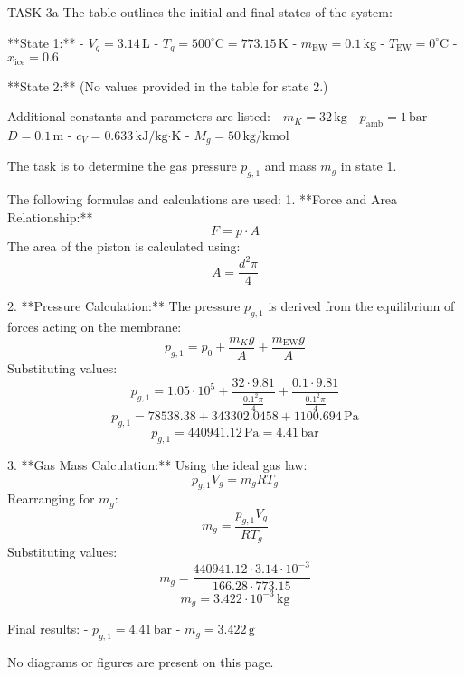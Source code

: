 TASK 3a  
The table outlines the initial and final states of the system:  

**State 1:**  
- \( V_g = 3.14 \, \text{L} \)  
- \( T_g = 500^\circ\text{C} = 773.15 \, \text{K} \)  
- \( m_{\text{EW}} = 0.1 \, \text{kg} \)  
- \( T_{\text{EW}} = 0^\circ\text{C} \)  
- \( x_{\text{ice}} = 0.6 \)  

**State 2:**  
(No values provided in the table for state 2.)  

Additional constants and parameters are listed:  
- \( m_K = 32 \, \text{kg} \)  
- \( p_{\text{amb}} = 1 \, \text{bar} \)  
- \( D = 0.1 \, \text{m} \)  
- \( c_V = 0.633 \, \text{kJ/kg·K} \)  
- \( M_g = 50 \, \text{kg/kmol} \)  

The task is to determine the gas pressure \( p_{g,1} \) and mass \( m_g \) in state 1.  

The following formulas and calculations are used:  
1. **Force and Area Relationship:**  
   \[ F = p \cdot A \]  
   The area of the piston is calculated using:  
   \[ A = \frac{d^2 \pi}{4} \]  

2. **Pressure Calculation:**  
   The pressure \( p_{g,1} \) is derived from the equilibrium of forces acting on the membrane:  
   \[ p_{g,1} = p_0 + \frac{m_K g}{A} + \frac{m_{\text{EW}} g}{A} \]  
   Substituting values:  
   \[ p_{g,1} = 1.05 \cdot 10^5 + \frac{32 \cdot 9.81}{\frac{0.1^2 \pi}{4}} + \frac{0.1 \cdot 9.81}{\frac{0.1^2 \pi}{4}} \]  
   \[ p_{g,1} = 78538.38 + 343302.0458 + 1100.694 \, \text{Pa} \]  
   \[ p_{g,1} = 440941.12 \, \text{Pa} = 4.41 \, \text{bar} \]  

3. **Gas Mass Calculation:**  
   Using the ideal gas law:  
   \[ p_{g,1} V_g = m_g R T_g \]  
   Rearranging for \( m_g \):  
   \[ m_g = \frac{p_{g,1} V_g}{R T_g} \]  
   Substituting values:  
   \[ m_g = \frac{440941.12 \cdot 3.14 \cdot 10^{-3}}{166.28 \cdot 773.15} \]  
   \[ m_g = 3.422 \cdot 10^{-3} \, \text{kg} \]  

Final results:  
- \( p_{g,1} = 4.41 \, \text{bar} \)  
- \( m_g = 3.422 \, \text{g} \)  

No diagrams or figures are present on this page.